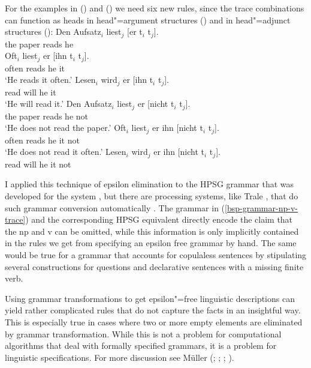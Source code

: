 For the examples in () and () we need six new rules, since the trace combinations
can function as heads in head"=argument structures () and in head"=adjunct structures ():
\eal
\ex 
\gll Den Aufsatz$_i$ liest$_j$ [er t$_i$ t$_j$].\\
     the paper       reads     \spacebr{}he\\
\ex 
\gll Oft$_i$ liest$_j$ er [ihn t$_i$ t$_j$].\\
     often reads he \spacebr{}it\\
\glt `He reads it often.'
\ex 
\gll Lesen$_i$ wird$_j$ er [ihn t$_i$ t$_j$].\\
     read      will     he \spacebr{}it\\
\glt `He will read it.'
\zl
\eal
\ex 
\gll Den Aufsatz$_i$ liest$_j$ er [nicht t$_i$ t$_j$].\\
     the paper       reads     he \spacebr{}not\\
\glt `He does not read the paper.'
\ex 
\gll Oft$_i$ liest$_j$ er ihn [nicht t$_i$ t$_j$].\\
     often   reads     he it \spacebr{}not\\
\glt `He does not read it often.'
\ex 
\gll Lesen$_i$ wird$_j$ er ihn [nicht t$_i$ t$_j$].\\
     read      will    he it  \spacebr{}not\\
\zl


I applied this technique of epsilon elimination to the HPSG grammar that
was developed for the \verbmobil system \citep{MK2000a}, 
but there are processing systems, like Trale \citep*{MPR2002a-u},
that do such grammar conversion automatically \citep{Penn99b}.
The grammar in (\ref{bsp-grammar-np-v-trace}) and the corresponding
HPSG equivalent directly encode the claim that the np and v can be omitted, while
this information is only implicitly contained in the rules we get from specifying an
epsilon free grammar by hand. 
The same would be true for a grammar that accounts for copulaless sentences by
stipulating several constructions for questions and declarative sentences with
a missing finite verb.

Using grammar transformations to get epsilon"=free linguistic descriptions can yield rather
complicated rules that do not capture the facts in an insightful way. This is
especially true in cases where two or more empty elements are eliminated by
grammar transformation. While this is not a problem for computational algorithms
that deal with formally specified grammars, it is a problem for linguistic specifications.
For more discussion see Müller (\citeyear[Chapter~6.2.5.1]{Mueller2002b};
\citeyear{Mueller2005c}; \citeyear{Mueller2004e}; \citeyear[Chapter~19]{MuellerGT-Eng1}).



